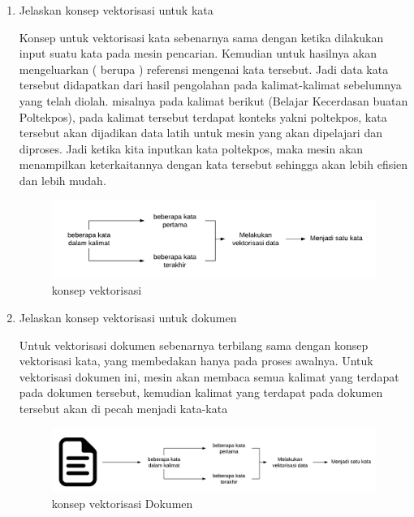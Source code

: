 \begin{enumerate}
			\item Jelaskan konsep vektorisasi untuk kata
			\par Konsep untuk vektorisasi kata sebenarnya sama dengan ketika dilakukan input suatu kata pada mesin pencarian. Kemudian untuk hasilnya akan mengeluarkan ( berupa ) referensi mengenai kata tersebut. Jadi data kata tersebut didapatkan dari hasil pengolahan pada kalimat-kalimat sebelumnya yang telah diolah. misalnya pada kalimat berikut (Belajar Kecerdasan buatan Poltekpos), pada kalimat tersebut terdapat konteks yakni poltekpos, kata tersebut akan dijadikan data latih untuk mesin yang akan dipelajari dan diproses. Jadi ketika kita inputkan kata poltekpos, maka mesin akan menampilkan keterkaitannya dengan kata tersebut sehingga akan lebih eﬁsien dan lebih mudah. 
			\begin{figure}[H]
				\centering
				\includegraphics[scale=0.4]{figures/1174057/chapter5/3.png}
				\caption{konsep vektorisasi}
				\label{konsep vektorisasi}
			\end{figure}

			\item Jelaskan konsep vektorisasi untuk dokumen
			\par Untuk vektorisasi dokumen sebenarnya terbilang sama dengan konsep vektorisasi kata, yang membedakan hanya pada proses awalnya. Untuk vektorisasi dokumen ini, mesin akan membaca semua kalimat yang terdapat pada dokumen tersebut, kemudian kalimat yang terdapat pada dokumen tersebut akan di pecah menjadi kata-kata
			\begin{figure}[H]
				\centering
				\includegraphics[scale=0.4]{figures/1174057/chapter5/4.png}
				\caption{konsep vektorisasi Dokumen}
				\label{konsep vektorisasi Dokumen}
			\end{figure}


\end{enumerate}
